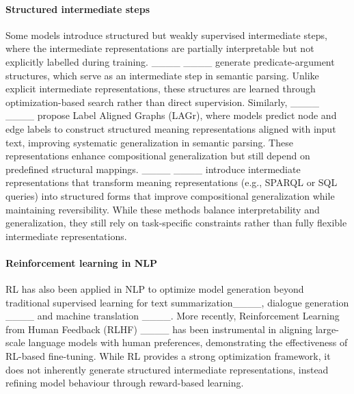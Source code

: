 \paragraph{Structured intermediate steps}
Some models introduce structured but weakly supervised intermediate steps, where the intermediate representations are partially interpretable but not explicitly labelled during training. ____ ____ generate predicate-argument structures, which serve as an intermediate step in semantic parsing. Unlike explicit intermediate representations, these structures are learned through optimization-based search rather than direct supervision.
Similarly, ____ ____ propose Label Aligned Graphs (LAGr), where models predict node and edge labels to construct structured meaning representations aligned with input text, improving systematic generalization in semantic parsing. These representations enhance compositional generalization but still depend on predefined structural mappings.
____ ____ introduce intermediate representations that transform meaning representations (e.g., SPARQL or SQL queries) into structured forms that improve compositional generalization while maintaining reversibility. 
While these methods balance interpretability and generalization, they still rely on task-specific constraints rather than fully flexible intermediate representations.

\paragraph{Reinforcement learning in NLP}
RL has also been applied in NLP to optimize model generation beyond traditional supervised learning for text summarization____, dialogue generation ____ and machine translation ____. More recently, Reinforcement Learning from Human Feedback (RLHF) ____ has been instrumental in aligning large-scale language models with human preferences, demonstrating the effectiveness of RL-based fine-tuning. While RL provides a strong optimization framework, it does not inherently generate structured intermediate representations, instead refining model behaviour through reward-based learning.




